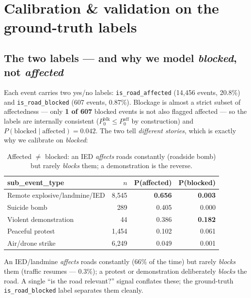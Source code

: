 \documentclass[11pt,a4paper]{article}
\newcommand{\code}[1]{\texttt{\small #1}}
\begin{document}
\section{Calibration \& validation on the ground-truth labels}
\label{sec:calib}

\subsection{The two labels --- and why we model \emph{blocked}, not \emph{affected}}

Each event carries two yes/no labels: \code{is\_road\_affected} (14{,}456 events, 20.8\%) and
\code{is\_road\_blocked} (607 events, 0.87\%). Blockage is almost a strict subset of
affectedness --- only \textbf{1 of 607} blocked events is not also flagged affected --- so the
labels are internally consistent ($P_0^{\text{blk}}\le P_0^{\text{aff}}$ by construction) and
$P(\text{blocked}\mid\text{affected})=0.042$. The two tell \emph{different stories}, which is
exactly why we calibrate on \emph{blocked}:

\begin{table}[h]
\centering
\renewcommand{\arraystretch}{1.2}
\begin{tabular}{@{}l r r r@{}}
\toprule
\textbf{sub\_event\_type} & \textbf{$n$} & \textbf{P(affected)} & \textbf{P(blocked)} \\
\midrule
Remote explosive/landmine/IED & 8{,}545 & \textbf{0.656} & \textbf{0.003} \\
Suicide bomb                  & 289     & 0.405 & 0.000 \\
Violent demonstration         & 44      & 0.386 & \textbf{0.182} \\
Peaceful protest              & 1{,}454 & 0.102 & 0.061 \\
Air/drone strike              & 6{,}249 & 0.049 & 0.001 \\
\bottomrule
\end{tabular}
\caption{Affected $\neq$ blocked: an IED \emph{affects} roads constantly (roadside bomb) but
rarely \emph{blocks} them; a demonstration is the reverse.}
\label{tab:divergence}
\end{table}

An IED/landmine \emph{affects} roads constantly (66\% of the time) but rarely \emph{blocks} them
(traffic resumes --- 0.3\%); a protest or demonstration deliberately \emph{blocks} the road. A
single ``is the road relevant?'' signal conflates these; the ground-truth \code{is\_road\_blocked}
label separates them cleanly.
\end{document}
